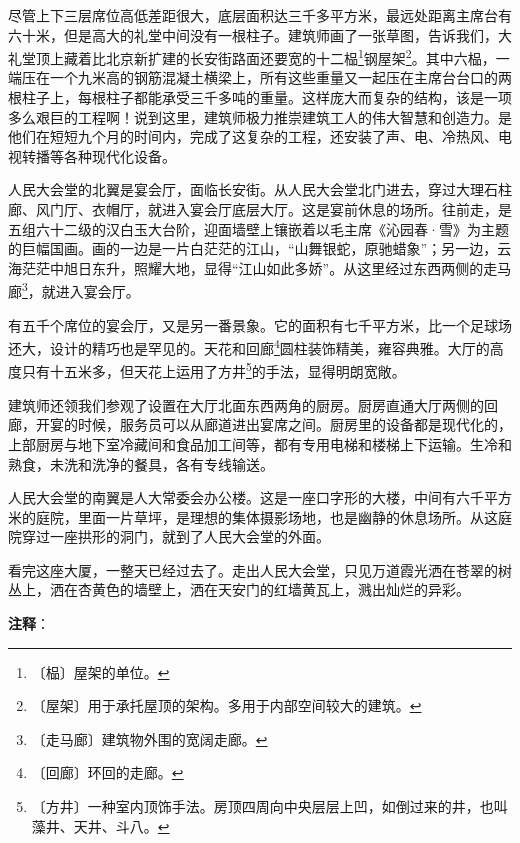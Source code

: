 \documentclass[12pt,UTF-8,openany]{ctexbook}
\begin{document}
\begin{large}
    尽管上下三层席位高低差距很大，底层面积达三千多平方米，最远处距离主席台有六十米，但是高大的礼堂中间没有一根柱子。建筑师画了一张草图，告诉我们，大礼堂顶上藏着比北京新扩建的长安街路面还要宽的十二榀\footnote{〔榀〕屋架的单位。}钢屋架\footnote{〔屋架〕用于承托屋顶的架构。多用于内部空间较大的建筑。}。其中六榀，一端压在一个九米高的钢筋混凝土横梁上，所有这些重量又一起压在主席台台口的两根柱子上，每根柱子都能承受三千多吨的重量。这样庞大而复杂的结构，该是一项多么艰巨的工程啊！说到这里，建筑师极力推崇建筑工人的伟大智慧和创造力。是他们在短短九个月的时间内，完成了这复杂的工程，还安装了声、电、冷热风、电视转播等各种现代化设备。
    
    人民大会堂的北翼是宴会厅，面临长安街。从人民大会堂北门进去，穿过大理石柱廊、风门厅、衣帽厅，就进入宴会厅底层大厅。这是宴前休息的场所。往前走，是五组六十二级的汉白玉大台阶，迎面墙壁上镶嵌着以毛主席《沁园春·雪》为主题的巨幅国画。画的一边是一片白茫茫的江山，“山舞银蛇，原驰蜡象”；另一边，云海茫茫中旭日东升，照耀大地，显得“江山如此多娇”。从这里经过东西两侧的走马廊\footnote{〔走马廊〕建筑物外围的宽阔走廊。}，就进入宴会厅。
    
    有五千个席位的宴会厅，又是另一番景象。它的面积有七千平方米，比一个足球场还大，设计的精巧也是罕见的。天花和回廊\footnote{〔回廊〕环回的走廊。}圆柱装饰精美，雍容典雅。大厅的高度只有十五米多，但天花上运用了方井\footnote{〔方井〕一种室内顶饰手法。房顶四周向中央层层上凹，如倒过来的井，也叫藻井、天井、斗八。}的手法，显得明朗宽敞。
    
    建筑师还领我们参观了设置在大厅北面东西两角的厨房。厨房直通大厅两侧的回廊，开宴的时候，服务员可以从廊道进出宴席之间。厨房里的设备都是现代化的，上部厨房与地下室冷藏间和食品加工间等，都有专用电梯和楼梯上下运输。生冷和熟食，未洗和洗净的餐具，各有专线输送。
    
    人民大会堂的南翼是人大常委会办公楼。这是一座口字形的大楼，中间有六千平方米的庭院，里面一片草坪，是理想的集体摄影场地，也是幽静的休息场所。从这庭院穿过一座拱形的洞门，就到了人民大会堂的外面。
    
    看完这座大厦，一整天已经过去了。走出人民大会堂，只见万道霞光洒在苍翠的树丛上，洒在杏黄色的墙壁上，洒在天安门的红墙黄瓦上，溅出灿烂的异彩。
    
\end{large}


\newpage

\textbf{注释}：

\vspace{-1em}
\end{document}
